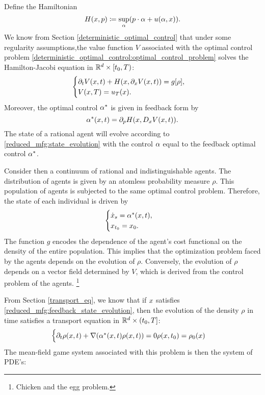 \documentclass{article}
\begin{document}
Define the Hamiltonian
\begin{equation}\label{reduced_mfg:hamiltonian}
        H(x,p) \coloneqq \sup_{\alpha} ( p \cdot \alpha + u(\alpha,x)).
\end{equation}
We know from Section
\eqref{deterministic_optimal_control}
that under some regularity assumptions,the value function $V$ associated with
the optimal control problem
\eqref{deterministic_optimal_control:optimal_control_problem} 
solves the Hamilton-Jacobi equation in $\mathbb{R}^d \times [t_0,T)$:
\begin{equation}\label{reduced_mfg:state_evolution_hamiltonian}
\begin{cases}
    \partial_t V (x,t) + H(x,\partial_x V(x,t)) = g[\rho], \\
    V(x,T) = u_T(x).
\end{cases}
\end{equation}
Moreover, the optimal control $\alpha^*$ is given in feedback form by
$$\alpha^*(x,t) = \partial_p H(x, D_x V(x, t)).$$
The state of a rational agent will evolve according to 
\eqref{reduced_mfg:state_evolution} with the control $\alpha$ equal to the feedback optimal control $\alpha^*$.

Consider then a continuum of rational and indistinguishable agents.
The distribution of agents is given by an atomless probability measure $\rho$.
This population of agents is subjected to the same optimal control problem.
Therefore, the state of each individual is driven by
\begin{equation}\label{reduced_mfg:feedback_state_evolution}
\begin{cases}
        {\dot {x}}_s = \alpha^*(x,t),\\
        {x}_{t_0} = x_0.
\end{cases}
\end{equation}
The function $g$ encodes the dependence of the agent's cost functional on the density of the entire population.
This implies that the optimization problem faced by the agents depends on the evolution of $\rho$.
Conversely, the evolution of $\rho$ depends on a vector field determined by $V$, which is derived from the control problem of the agents.
\footnote{Chicken and the egg problem.}

From Section
\eqref{transport_eq},
we know that if $x$ satisfies
\eqref{reduced_mfg:feedback_state_evolution},
then the evolution of the density $\rho$ in time satisfies a transport equation in $\mathbb{R}^d \times (t_0, T]$:
\begin{equation}\label{reduced_mfg:density_transport_pde}
    \begin{cases}
        \partial_t \rho(x,t) + \nabla(\alpha^*(x,t) \rho(x,t)) = 0
        \rho(x,t_0) = \rho_0(x)
\end{cases}
\end{equation}
The mean-field game system associated with this problem is then the system of PDE's:
\end{document}
